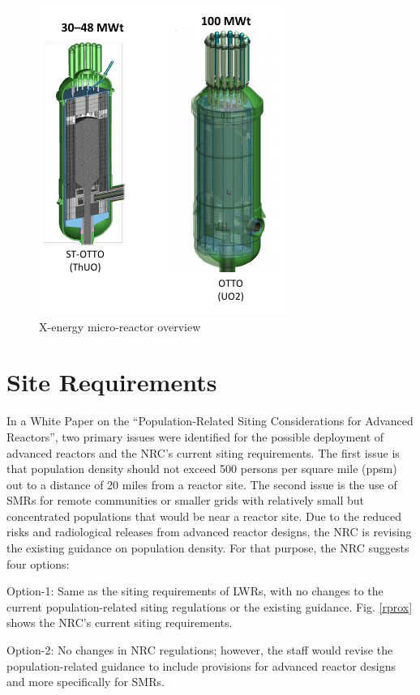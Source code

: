 \documentclass[10pt,a4paper]{article}
\begin{document}
\begin{figure}[hbtp]
\centering
\includegraphics[scale=0.97]{Figs/xoverview.jpeg}
\caption{X-energy micro-reactor overview}
\label{xo}
\end{figure} 

\pagebreak
\section{Site Requirements}

In a White Paper \cite{nrc_staff_population-related_2019} on the “Population-Related Siting Considerations for Advanced Reactors”, two primary issues were identified for the possible deployment of advanced reactors and the NRC’s current siting requirements. The first issue is that population density should not exceed 500 persons per square mile (ppsm) out to a distance of 20 miles from a reactor site. The second issue is the use of SMRs for remote communities or smaller grids with relatively small but concentrated populations that would be near a reactor site. Due to the reduced risks and radiological releases from advanced reactor designs, the NRC is revising the existing guidance on population density.  For that purpose, the NRC suggests four options:

Option-1: Same as the siting requirements of LWRs, with no changes to the current population-related siting regulations or the existing guidance. Fig. \ref{rprox} shows the NRC’s current siting requirements. 

Option-2:  No changes in NRC regulations; however, the staff would revise the population-related guidance to include provisions for advanced reactor designs and more specifically for SMRs.
\end{document}
